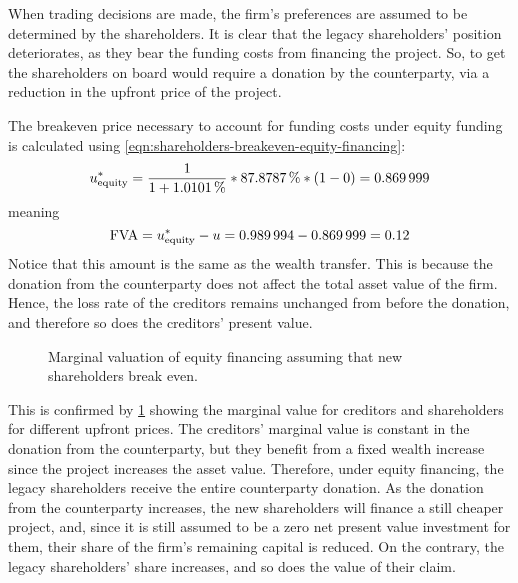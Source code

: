 \documentclass[main.tex]{subfiles}
\begin{document}
        When trading decisions are made, the firm's preferences are assumed to be determined by the shareholders.
        It is clear that the legacy shareholders' position deteriorates, 
        as they bear the funding costs from financing the project.
        So, to get the shareholders on board would require a donation by the counterparty, 
        via a reduction in the upfront price of the project.

        The breakeven price necessary to account for funding costs under equity funding is calculated using
        \cref{eqn:shareholders-breakeven-equity-financing}:
            \begin{equation*}
                    u^{\ast}_{\text{equity}} 
                =
                    \frac{1}{1 + \pct{0.010101}} 
                    *
                    \pct{0.878787}
                    *
                    \left(
                        \num{1}
                        -
                        \num{0}
                    \right)
                =
                    \num{0.869999}
            \end{equation*}
        meaning 
        \begin{equation*}
            \FVA/ = u^{\ast}_{\text{equity}} - u =
            \num{0.989994}-\num{0.869999} =
            \num{0.12}
        \end{equation*}
        Notice that this amount is the same as the wealth transfer.
        This is because the donation from the counterparty does not affect the total asset value of the firm.
        Hence, the loss rate of the creditors remains unchanged from before the donation, and therefore so does the creditors' present value.

        \begin{figure}
            \centering
            \resizebox{\textwidth}{!}{%
                
            }
            \caption{
                Marginal valuation of equity financing 
                assuming that new shareholders break even.
            }
            \label{fig:marginal-value-equity-financing}
        \end{figure}

        This is confirmed by \cref{fig:marginal-value-equity-financing} showing
        the marginal value for creditors and shareholders for different upfront prices.
        The creditors' marginal value is constant in the donation from the counterparty,
        but they benefit from a fixed wealth increase since the project increases the asset value.
        Therefore, under equity financing, 
        the legacy shareholders receive the entire counterparty donation.
        As the donation from the counterparty increases,
        the new shareholders will finance a still cheaper project, 
        and, since it is still assumed to be a zero net present value investment for them, 
        their share of the firm's remaining capital is reduced.
        On the contrary, the legacy shareholders' share increases,
        and so does the value of their claim.
\end{document}
